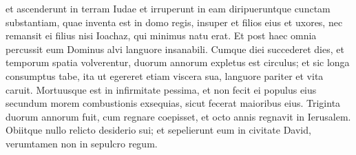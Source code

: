 \begin{biblechapter}
\begin{biblechapter}
\begin{biblechapter}
\begin{biblechapter}
\begin{biblechapter}
\begin{biblechapter}
\begin{biblechapter}
\begin{biblechapter}
\begin{biblechapter}
\begin{biblechapter}
\begin{biblechapter}
\begin{biblechapter}
\begin{biblechapter}
\begin{biblechapter}
\begin{biblechapter}
\begin{biblechapter}
\begin{biblechapter}
\begin{biblechapter}
\begin{biblechapter}
\begin{biblechapter}
\begin{biblechapter}
\verse et ascenderunt in terram Iudae et irruperunt in eam diripueruntque cunctam substantiam, quae inventa est in domo regis, insuper et filios eius et uxores, nec remansit ei filius nisi Ioachaz, qui minimus natu erat.
 \verse Et post haec omnia percussit eum Dominus alvi languore insanabili. 
\verse Cumque diei succederet dies, et temporum spatia volverentur, duorum annorum expletus est circulus; et sic longa consumptus tabe, ita ut egereret etiam viscera sua, languore pariter et vita caruit. Mortuusque est in infirmitate pessima, et non fecit ei populus eius secundum morem combustionis exsequias, sicut fecerat maioribus eius.
 \verse Triginta duorum annorum fuit, cum regnare coepisset, et octo annis regnavit in Ierusalem. Obiitque nullo relicto desiderio sui; et sepelierunt eum in civitate David, verumtamen non in sepulcro regum.
 

\end{biblechapter}
\end{biblechapter}
\end{biblechapter}
\end{biblechapter}
\end{biblechapter}
\end{biblechapter}
\end{biblechapter}
\end{biblechapter}
\end{biblechapter}
\end{biblechapter}
\end{biblechapter}
\end{biblechapter}
\end{biblechapter}
\end{biblechapter}
\end{biblechapter}
\end{biblechapter}
\end{biblechapter}
\end{biblechapter}
\end{biblechapter}
\end{biblechapter}
\end{biblechapter}
